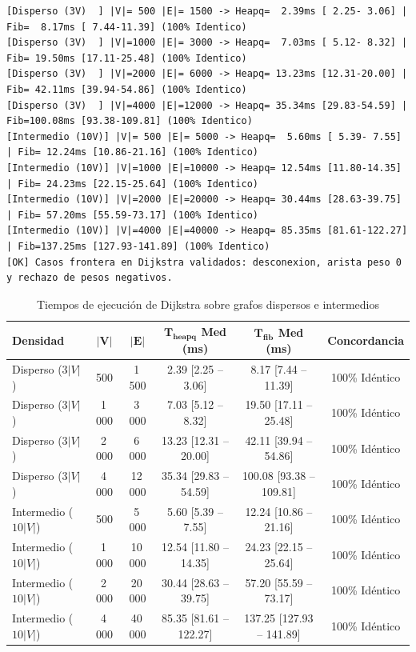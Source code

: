 \begin{lstlisting}[style=consolestyle, caption={Salida de consola de Dijkstra sobre grafos sintéticos (5 repeticiones)}]
[Disperso (3V)  ] |V|= 500 |E|= 1500 -> Heapq=  2.39ms [ 2.25- 3.06] | Fib=  8.17ms [ 7.44-11.39] (100% Identico)
[Disperso (3V)  ] |V|=1000 |E|= 3000 -> Heapq=  7.03ms [ 5.12- 8.32] | Fib= 19.50ms [17.11-25.48] (100% Identico)
[Disperso (3V)  ] |V|=2000 |E|= 6000 -> Heapq= 13.23ms [12.31-20.00] | Fib= 42.11ms [39.94-54.86] (100% Identico)
[Disperso (3V)  ] |V|=4000 |E|=12000 -> Heapq= 35.34ms [29.83-54.59] | Fib=100.08ms [93.38-109.81] (100% Identico)
[Intermedio (10V)] |V|= 500 |E|= 5000 -> Heapq=  5.60ms [ 5.39- 7.55] | Fib= 12.24ms [10.86-21.16] (100% Identico)
[Intermedio (10V)] |V|=1000 |E|=10000 -> Heapq= 12.54ms [11.80-14.35] | Fib= 24.23ms [22.15-25.64] (100% Identico)
[Intermedio (10V)] |V|=2000 |E|=20000 -> Heapq= 30.44ms [28.63-39.75] | Fib= 57.20ms [55.59-73.17] (100% Identico)
[Intermedio (10V)] |V|=4000 |E|=40000 -> Heapq= 85.35ms [81.61-122.27] | Fib=137.25ms [127.93-141.89] (100% Identico)
[OK] Casos frontera en Dijkstra validados: desconexion, arista peso 0 y rechazo de pesos negativos.
\end{lstlisting}

\begin{table}[H]
    \caption{Tiempos de ejecución de Dijkstra sobre grafos dispersos e intermedios}
    \label{tab:dijkstra}
    \centering
    \scriptsize
    \setlength{\tabcolsep}{4pt}
    \begin{tabular*}{\textwidth}{@{\extracolsep{\fill}}lccccc}
        \toprule
        \textbf{Densidad} & $\mathbf{|V|}$ & $\mathbf{|E|}$ & $\mathbf{T_{\text{heapq}}}$ \textbf{Med (ms)} & $\mathbf{T_{\text{fib}}}$ \textbf{Med (ms)} & \textbf{Concordancia} \\
        \midrule
        Disperso ($3|V|$)    & 500   & 1\,500  & 2.39 [2.25 -- 3.06]   & 8.17 [7.44 -- 11.39]   & 100\% Idéntico \\
        Disperso ($3|V|$)    & 1\,000 & 3\,000  & 7.03 [5.12 -- 8.32]   & 19.50 [17.11 -- 25.48]  & 100\% Idéntico \\
        Disperso ($3|V|$)    & 2\,000 & 6\,000  & 13.23 [12.31 -- 20.00] & 42.11 [39.94 -- 54.86]  & 100\% Idéntico \\
        Disperso ($3|V|$)    & 4\,000 & 12\,000 & 35.34 [29.83 -- 54.59] & 100.08 [93.38 -- 109.81] & 100\% Idéntico \\
        \midrule
        Intermedio ($10|V|$) & 500   & 5\,000  & 5.60 [5.39 -- 7.55]   & 12.24 [10.86 -- 21.16]  & 100\% Idéntico \\
        Intermedio ($10|V|$) & 1\,000 & 10\,000 & 12.54 [11.80 -- 14.35] & 24.23 [22.15 -- 25.64]  & 100\% Idéntico \\
        Intermedio ($10|V|$) & 2\,000 & 20\,000 & 30.44 [28.63 -- 39.75] & 57.20 [55.59 -- 73.17]  & 100\% Idéntico \\
        Intermedio ($10|V|$) & 4\,000 & 40\,000 & 85.35 [81.61 -- 122.27] & 137.25 [127.93 -- 141.89] & 100\% Idéntico \\
        \bottomrule
    \end{tabular*}
\end{table}

